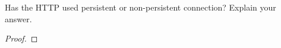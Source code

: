 \documentclass[../../main.tex]{subfiles}
\begin{document}
\begin{wts}
Has the HTTP used persistent or non-persistent connection? Explain your answer.  
\end{wts}
\begin{proof}

\end{proof}
\end{document}
